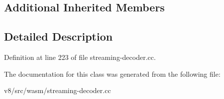 \subsection*{Additional Inherited Members}


\subsection{Detailed Description}


Definition at line 223 of file streaming-\/decoder.\+cc.



The documentation for this class was generated from the following file\+:\begin{DoxyCompactItemize}
\item 
v8/src/wasm/streaming-\/decoder.\+cc\end{DoxyCompactItemize}
